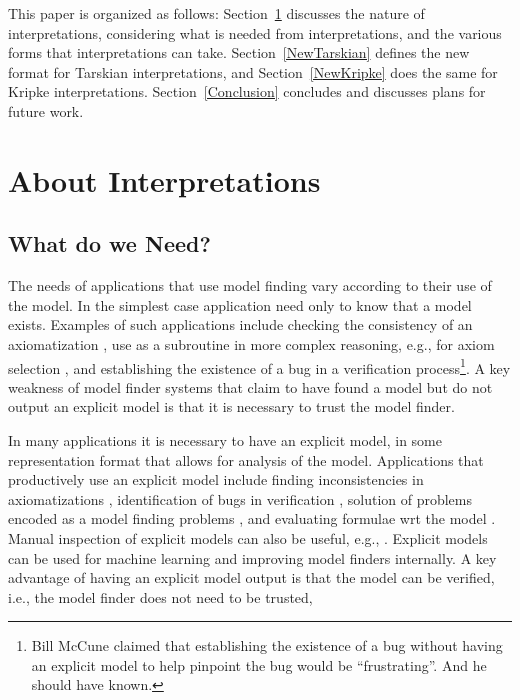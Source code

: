 \documentclass{easychair}
\begin{document}
\vspace*{1em}
This paper is organized as follows:
Section~\ref{Interpretations} discusses the nature of interpretations, considering what is
needed from interpretations, and the various forms that interpretations can take.
Section~\ref{NewTarskian} defines the new format for Tarskian interpretations, and
Section~\ref{NewKripke} does the same for Kripke interpretations.
Section~\ref{Conclusion} concludes and discusses plans for future work.

\section{About Interpretations}
\label{Interpretations}

\subsection{What do we Need?}
\label{Need}

The needs of applications that use model finding vary according to their use of the model.
In the simplest case application need only to know that a model exists.
Examples of such applications include checking the consistency of an axiomatization \cite{CI15},
use as a subroutine in more complex reasoning, e.g., for
axiom selection \cite{SP07,Pud07-ESARLT}, and establishing the existence of a bug in a
verification process\footnote{%
Bill McCune claimed that establishing the existence of a bug without having an explicit model
to help pinpoint the bug would be ``frustrating''. And he should have known.}.
A key weakness of model finder systems that claim to have found a model but do not output an 
explicit model is that it is necessary to trust the model finder.

In many applications it is necessary to have an explicit model, in some representation format that
allows for analysis of the model.
Applications that productively use an explicit model include finding inconsistencies in 
axiomatizations \cite{SS+17}, identification of bugs in verification \cite{CE82,QS82},
solution of problems encoded as a model finding problems \cite{Win82}, and evaluating formulae
wrt the model \cite{SS+23-LPAR}.
Manual inspection of explicit models can also be useful, e.g., \cite{EK+10}.
Explicit models can be used for machine learning and improving model finders internally.
A key advantage of having an explicit model output is that the model can be verified, i.e., the
model finder does not need to be trusted,
\end{document}
